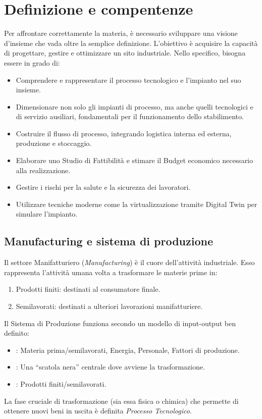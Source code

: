 %
\section{Definizione e compentenze}
Per affrontare correttamente la materia, è necessario sviluppare una visione d'insieme che vada oltre la semplice definizione. L'obiettivo è acquisire la capacità di progettare, gestire e ottimizzare un sito industriale. Nello specifico, bisogna essere in grado di:
\begin{itemize}
    \item Comprendere e rappresentare il processo tecnologico e l'impianto nel suo insieme.
    \item Dimensionare non solo gli impianti di processo, ma anche quelli tecnologici e di servizio ausiliari, fondamentali per il funzionamento dello stabilimento.
    \item Costruire il flusso di processo, integrando logistica interna ed esterna, produzione e stoccaggio.
    \item Elaborare uno Studio di Fattibilità e stimare il Budget economico necessario alla realizzazione.
    \item Gestire i rischi per la salute e la sicurezza dei lavoratori.
    \item Utilizzare tecniche moderne come la virtualizzazione tramite Digital Twin per simulare l'impianto.
\end{itemize}
%
\subsection{Manufacturing e sistema di produzione}
Il settore Manifatturiero (\emph{Manufacturing}) è il cuore dell'attività industriale. Esso rappresenta l'attività umana volta a trasformare le materie prime in:
\begin{enumerate}
    \item Prodotti finiti: destinati al consumatore finale.
    \item Semilavorati: destinati a ulteriori lavorazioni manifatturiere.
\end{enumerate}
Il Sistema di Produzione funziona secondo un modello di input-output ben definito:
\begin{itemize}
    \item {}: Materia prima/semilavorati, Energia, Personale, Fattori di produzione.
    \item {}: Una ``scatola nera'' centrale dove avviene la trasformazione.
    \item {}: Prodotti finiti/semilavorati.
\end{itemize}
La fase cruciale di trasformazione (sia essa fisica o chimica) che permette di ottenere nuovi beni in uscita è definita \emph{Processo Tecnologico}.
%
